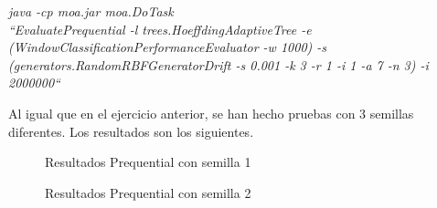 \textit{java -cp moa.jar moa.DoTask \\ ``EvaluatePrequential -l trees.HoeffdingAdaptiveTree
-e (WindowClassificationPerformanceEvaluator -w 1000) -s
(generators.RandomRBFGeneratorDrift -s 0.001 -k 3 -r 1 -i 1 -a 7 -n 3)
-i 2000000``}

Al igual que en el ejercicio anterior, se han hecho pruebas con 3 semillas diferentes. Los resultados son los siguientes.

\begin{figure}[H]
	\centering
	\caption{Resultados Prequential con semilla 1}
	\label{fig:res41}
\end{figure}

\begin{figure}[H]
	\centering
	\caption{Resultados Prequential con semilla 2}
	\label{fig:res42}
\end{figure}

